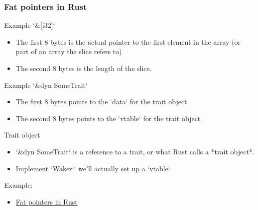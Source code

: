 \begin{frame}[fragile]
    \frametitle{Fat pointers in Rust}
% 
% 
{\color{red}Example `\&[i32]`}
 
     \begin{itemize}
         \item The first 8 bytes is the actual pointer to the first element in the array (or part of an array the slice refers to)
         \item The second 8 bytes is the length of the slice.
     \end{itemize}
 
{\color{red}Example `\&dyn SomeTrait`}
 
     \begin{itemize}
         \item The first 8 bytes points to the `data` for the trait object
         \item The second 8 bytes points to the `vtable` for the trait object
     \end{itemize}
 
{\color{red}Trait object}

    \begin{itemize}
        \item `\&dyn SomeTrait` is a reference to a trait, or what Rust calls a *trait object*.
        \item Implement `Waker:` we'll actually set up a `vtable`
    \end{itemize}

Example:

    \begin{itemize}
        \item \href{https://cfsamson.github.io/books-futures-explained/2_waker_context.html#fat-pointers-in-rust}{Fat pointers in Rust}
    \end{itemize}

\end{frame}
